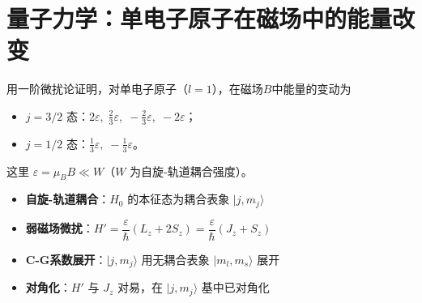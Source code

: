\section{量子力学：单电子原子在磁场中的能量改变}
\label{sec:single-electron-zeeman}

\begin{modelbox}[题目：单电子原子在磁场中的能量改变]
用一阶微扰论证明，对单电子原子（$l=1$），在磁场$B$中能量的变动为
\begin{itemize}
    \item $j=3/2$ 态：$2\varepsilon,\;\frac23\varepsilon,\;-\frac23\varepsilon,\;-2\varepsilon$；
    \item $j=1/2$ 态：$\frac13\varepsilon,\;-\frac13\varepsilon$。
\end{itemize}
这里 $\varepsilon=\mu_B B\ll W$（$W$ 为自旋-轨道耦合强度）。
\end{modelbox}

\begin{tipbox}[考点快速分析]
\begin{itemize}
    \item \textbf{自旋-轨道耦合}：$H_0$ 的本征态为耦合表象 $|j,m_j\rangle$
    \item \textbf{弱磁场微扰}：$H'=\dfrac{\varepsilon}{\hbar}(L_z+2S_z)=\dfrac{\varepsilon}{\hbar}(J_z+S_z)$
    \item \textbf{C-G系数展开}：$|j,m_j\rangle$ 用无耦合表象 $|m_l,m_s\rangle$ 展开
    \item \textbf{对角化}：$H'$ 与 $J_z$ 对易，在 $|j,m_j\rangle$ 基中已对角化
\end{itemize}
\end{tipbox}

